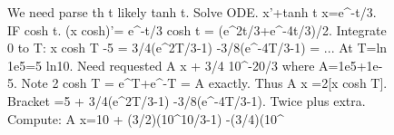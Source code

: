 \begin{figure}[t]
\begin{reasoncol}[equal height group=reasODE]
  \par\vspace{1pt}
  \caret{}\par\vspace{4pt}
  \raggedright We need parse th t likely tanh t. Solve ODE. x'+tanh t
  x=e\textasciicircum{}-t/3. IF cosh t. (x cosh)'= e\textasciicircum{}-t/3
  cosh t = (e\textasciicircum{2t/3}+e\textasciicircum{-4t/3})/2. Integrate 0
  to T: x cosh T -5 = 3/4(e\textasciicircum{2T/3}-1)
  -3/8(e\textasciicircum{}-4T/3-1) = ... At T=ln 1e5=5 ln10. Need requested A
  x + 3/4 10\textasciicircum{}-20/3 where A=1e5+1e-5. Note 2 cosh T =
  e\textasciicircum T+e\textasciicircum{}-T = A exactly. Thus A x =2[x cosh
  T]. Bracket =5 + 3/4(e\textasciicircum{2T/3}-1)
  -3/8(e\textasciicircum{}-4T/3-1). Twice plus extra. Compute: A x=10 +
  (3/2)(10\textasciicircum{10/3}-1) -(3/4)(10\textasciicircum{}\par
  \vspace{3pt}\elide
\end{reasoncol}

\vspace{12pt}


\end{figure}

